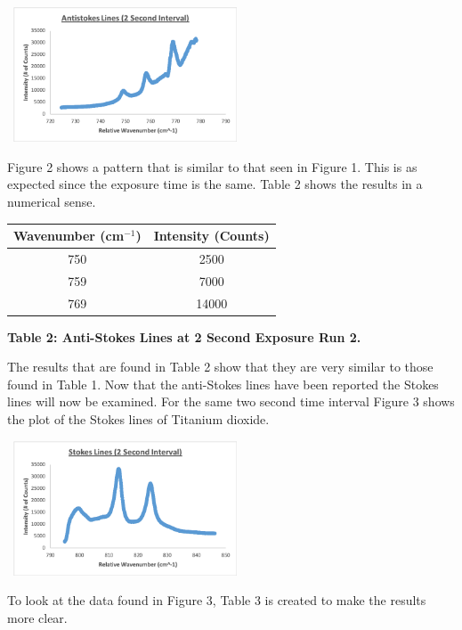 \documentclass[]{article}
\begin{document}
\begin{multicols}{2}
\begin{center}
    \includegraphics[width=7cm, height=4cm]{PHYS 331 RS (2 Sec) 1b.png}
    \caption{\textbf{\small{Figure 2: Anti-Stokes Lines at 2 Second Exposure Run 2.}}}
\end{center}
Figure 2 shows a pattern that is similar to that seen in Figure 1. This is as expected since the exposure time is the same. Table 2 shows the results in a numerical sense.
\newline
\begin{tabular}{|c|c|}
    \hline \textbf{Wavenumber (cm$^{-1}$)} & \textbf{Intensity (Counts)} \\ \hline
    750 & 2500 \\ \hline
    759 & 7000 \\ \hline
    769 & 14000 \\ \hline
\end{tabular}
\centerline{\tiny\textbf{{Table 2: Anti-Stokes Lines at 2 Second Exposure Run 2.}}}
\newline
The results that are found in Table 2 show that they are very similar to those found in Table 1. Now that the anti-Stokes lines have been reported the Stokes lines will now be examined. For the same two second time interval Figure 3 shows the plot of the Stokes lines of Titanium dioxide. 
\begin{center}
    \includegraphics[width=7cm, height=4cm]{PHYS 331 RS (2 Sec) 2a.png}
    \caption{\textbf{\small{Figure 3:} Stokes Lines at 2 Second Exposure Run 1.}}
\end{center}
To look at the data found in Figure 3, Table 3 is created to make the results more clear.

\end{multicols}
\end{document}
